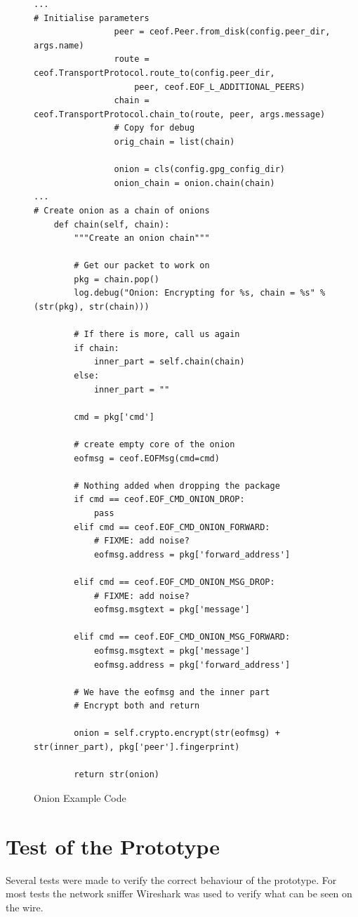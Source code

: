 \begin{figure}[htbp][htb]
\caption{Onion Example Code}
\label{onionexample}
\begin{verbatim}
...
# Initialise parameters
                peer = ceof.Peer.from_disk(config.peer_dir, args.name)
                route = ceof.TransportProtocol.route_to(config.peer_dir, 
                    peer, ceof.EOF_L_ADDITIONAL_PEERS)
                chain = ceof.TransportProtocol.chain_to(route, peer, args.message)
                # Copy for debug
                orig_chain = list(chain)

                onion = cls(config.gpg_config_dir)
                onion_chain = onion.chain(chain)
...
# Create onion as a chain of onions
    def chain(self, chain):
        """Create an onion chain"""

        # Get our packet to work on
        pkg = chain.pop()
        log.debug("Onion: Encrypting for %s, chain = %s" % (str(pkg), str(chain)))

        # If there is more, call us again
        if chain:
            inner_part = self.chain(chain)
        else:
            inner_part = ""

        cmd = pkg['cmd']

        # create empty core of the onion
        eofmsg = ceof.EOFMsg(cmd=cmd)

        # Nothing added when dropping the package
        if cmd == ceof.EOF_CMD_ONION_DROP:
            pass
        elif cmd == ceof.EOF_CMD_ONION_FORWARD:
            # FIXME: add noise?
            eofmsg.address = pkg['forward_address']

        elif cmd == ceof.EOF_CMD_ONION_MSG_DROP:
            # FIXME: add noise?
            eofmsg.msgtext = pkg['message']
            
        elif cmd == ceof.EOF_CMD_ONION_MSG_FORWARD:
            eofmsg.msgtext = pkg['message']
            eofmsg.address = pkg['forward_address']

        # We have the eofmsg and the inner part
        # Encrypt both and return

        onion = self.crypto.encrypt(str(eofmsg) + str(inner_part), pkg['peer'].fingerprint)

        return str(onion)
\end{verbatim}
\end{figure}
\section{Test of the Prototype}
Several tests were made to verify the correct behaviour of the prototype.
For most tests the network sniffer Wireshark was used to verify what can be
seen on the wire.
